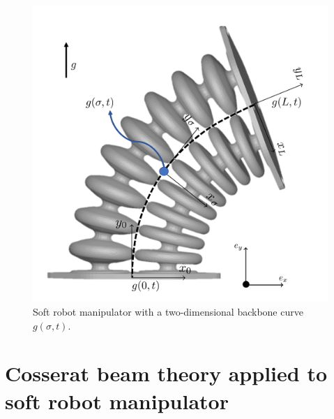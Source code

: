 \begin{figure}[H]
\begin{minipage}{.5\textwidth}
    \includegraphics[width=\textwidth]{Figures/Chapter2/actuatorschematic.png}
    \vspace{15pt}
    \caption{Soft robot manipulator with a two-dimensional backbone curve $g(\sigma,t)$.}
    \label{fig2:kinematicschematic}
\end{minipage}
\end{figure}





\section{Cosserat beam theory applied to soft robot manipulator}

